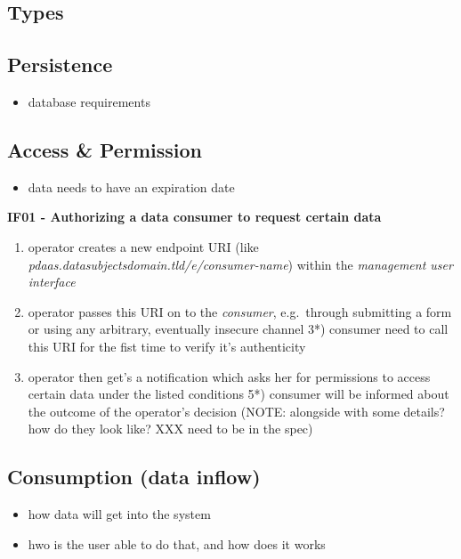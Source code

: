 \documentclass[12pt,english,a4paper,titlepage,cleardoublepage=empty,dottedtoc]{report}
\providecommand{\tightlist}{%
  \setlength{\itemsep}{0pt}\setlength{\parskip}{0pt}}
\begin{document}
\subsection{Types}\label{types}

\subsection{Persistence}\label{persistence-1}

\begin{itemize}
\tightlist
\item
  database requirements
\end{itemize}

\subsection{Access \& Permission}\label{access-permission}

\begin{itemize}
\tightlist
\item
  data needs to have an expiration date
\end{itemize}

\textbf{IF01 - Authorizing a data consumer to request certain data}

\begin{enumerate}
\def\labelenumi{\arabic{enumi})}
\tightlist
\item
  operator creates a new endpoint URI (like
  \emph{pdaas.datasubjectsdomain.tld/e/consumer-name}) within the
  \emph{management user interface}
\item
  operator passes this URI on to the \emph{consumer}, e.g.~through
  submitting a form or using any arbitrary, eventually insecure channel
  3*) consumer need to call this URI for the fist time to verify it's
  authenticity
\item
  operator then get's a notification which asks her for permissions to
  access certain data under the listed conditions 5*) consumer will be
  informed about the outcome of the operator's decision (NOTE: alongside
  with some details? how do they look like? XXX need to be in the spec)
\end{enumerate}

\subsection{Consumption (data inflow)}\label{consumption-data-inflow}

\begin{itemize}
\tightlist
\item
  how data will get into the system
\item
  hwo is the user able to do that, and how does it works
\end{itemize}
\end{document}
